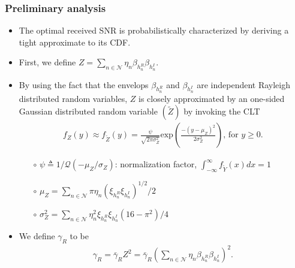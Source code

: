 \documentclass[article,mathserif,10pt,envcountsect]{beamer}
\newcommand{\Exp}[1]{\mathrm{exp}\left(#1\right)}
\begin{document}
\begin{frame}
	\frametitle{Preliminary analysis}
	\begin{itemize}
		\item The optimal received SNR is probabilistically characterized by deriving a tight approximate to its CDF.
		
		\item First, we define $Z=\sum_{n \in \mathcal{N}} \eta_{n} \beta_{h_{n}^R}  \beta_{h_{n}^I}$.
		
		\item By using the fact that the envelops $\beta_{h_{n}^R}$ and $\beta_{h_{n}^I}$ are independent Rayleigh distributed random variables, $Z$ is closely approximated   by an one-sided  Gaussian distributed random variable $(\tilde{Z})$ by invoking the CLT
		\begin{eqnarray}\label{eqn:pdf_Y}
		\!\!\!\!\!\!\! f_Z(y) \!\approx\! 	f_{\tilde Z}(y) \!=\!
		\frac{\psi}{\sqrt{2 \pi \sigma_{Z}^2}} \Exp{\!\frac{-(y\!-\!\mu_Z)^2}{2 \sigma_{Z}^2}\!}\!, \,  \text{for}  \,\, y \!\geq\! 0. \nonumber
		\end{eqnarray}
	
	\begin{itemize}
		\item[$\circ$]  $\psi \triangleq 1/\mathcal{Q}\left(-\mu_Z/\sigma_{Z}\right)$: normalization factor,   $\int_{-\infty}^{\infty} f_{\tilde Y}(x) dx=1$
		
		\item[$\circ$] $\mu_Z = \sum\nolimits_{n \in{\mathcal{N}}}  \pi \eta_{n} \left(\xi_{h_n^R} \xi_{h_n^I}\right)^{1/2}/2$
		
		\item[$\circ$] $\sigma_{Z}^2 = \sum\nolimits_{n \in{\mathcal{N}}}  \eta_{n}^2 \xi_{h_n^R} \xi_{h_n^I} \left(16-\pi^2\right)/4$
	\end{itemize}

	\item We define $\gamma_R$ to be 
	\begin{eqnarray}  
	\!\!\!\!\!\!\! \gamma_R=\bar{\gamma}_R Z^2 = \bar{\gamma}_R  \left(\sum\nolimits_{n \in \mathcal{N}} \eta_{n} \beta_{h_{n}^R}  \beta_{h_{n}^I} \right)^2. \label{eqn:gamma_R}  \nonumber
	\end{eqnarray} 
	

		
	\end{itemize}
	
\end{frame}	
\end{document}
